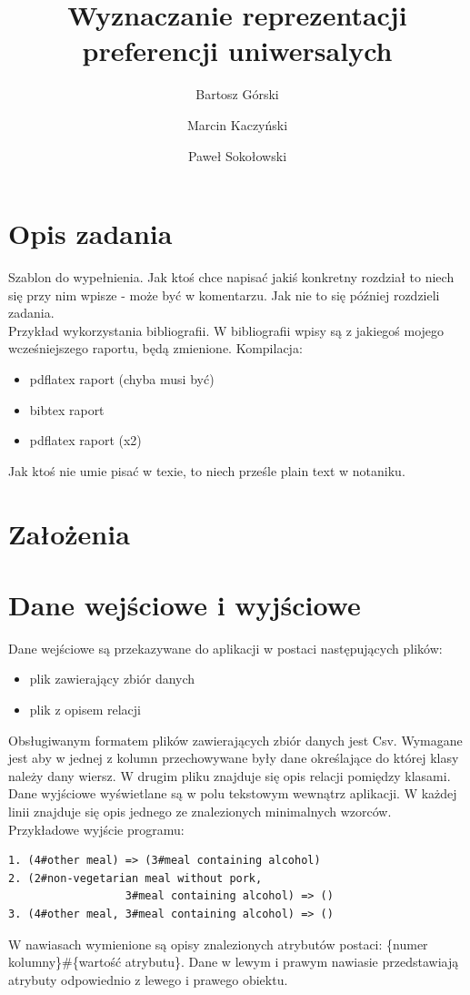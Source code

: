 \documentclass[a4paper,12pt]{article}
\title{Wyznaczanie reprezentacji preferencji uniwersalych}
\author{Bartosz Górski \and Marcin Kaczyński \and Paweł Sokołowski}
\begin{document}
\maketitle

\section{Opis zadania} 

Szablon do wypełnienia. Jak ktoś chce napisać jakiś konkretny rozdział to niech się przy nim wpisze - może być w komentarzu. 
Jak nie to się później rozdzieli zadania.\\

Przykład wykorzystania bibliografii\cite{fst}. W bibliografii wpisy są z jakiegoś mojego wcześniejszego raportu, będą zmienione. Kompilacja:

\begin{itemize}
\item pdflatex raport (chyba musi być)
\item bibtex raport
\item pdflatex raport (x2)
\end{itemize}

Jak ktoś nie umie pisać w texie, to niech prześle plain text w notaniku.

\section{Założenia}
\section{Dane wejściowe i wyjściowe}
Dane wejściowe są przekazywane do aplikacji w postaci następujących plików:
\begin{itemize}
\item plik zawierający zbiór danych
\item plik z opisem relacji
\end{itemize}
Obsługiwanym formatem plików zawierających zbiór danych jest Csv. Wymagane jest aby w jednej z kolumn przechowywane były dane określające do której klasy należy dany wiersz. W drugim pliku znajduje się opis relacji pomiędzy klasami. \\
Dane wyjściowe wyświetlane są w polu tekstowym wewnątrz aplikacji. W każdej linii znajduje się opis jednego ze znalezionych minimalnych wzorców. Przykładowe wyjście programu:
\lstset{frame=single, xleftmargin=6pt, xrightmargin=6pt, framesep=6pt}
\begin{lstlisting}
1. (4#other meal) => (3#meal containing alcohol)
2. (2#non-vegetarian meal without pork, 
                  3#meal containing alcohol) => ()
3. (4#other meal, 3#meal containing alcohol) => ()
\end{lstlisting}
W nawiasach wymienione są opisy znalezionych atrybutów postaci: \{numer kolumny\}\#\{wartość atrybutu\}. Dane w lewym i prawym nawiasie przedstawiają atrybuty odpowiednio z lewego i prawego obiektu. 
\end{document}
